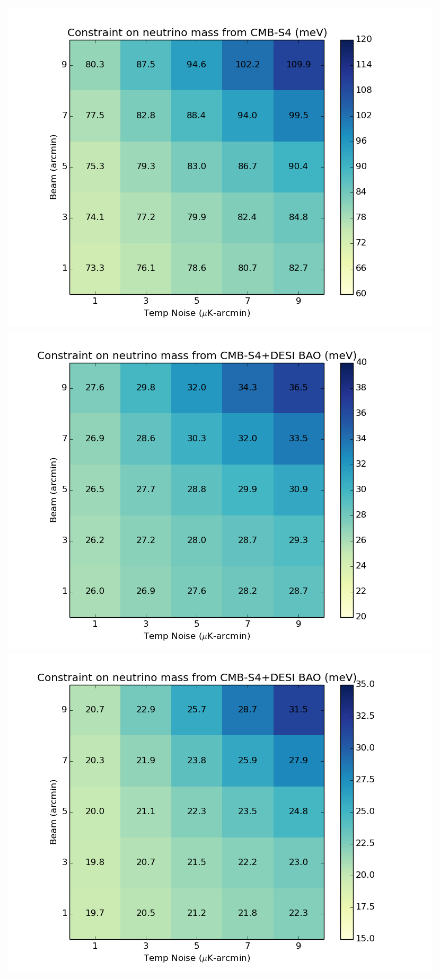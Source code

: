 \begin{figure}[h!]
\begin{center}
\includegraphics[scale=0.4]{Neutrinos/S4_BeamVsNoise.png}
\includegraphics[scale=0.4]{Neutrinos/S4+DESI_BeamVsNoise.png}  
\includegraphics[scale=0.4]{Neutrinos/S4+DESI_BeamVsNoise_tauprior.png}


\end{center}
\end{figure}
